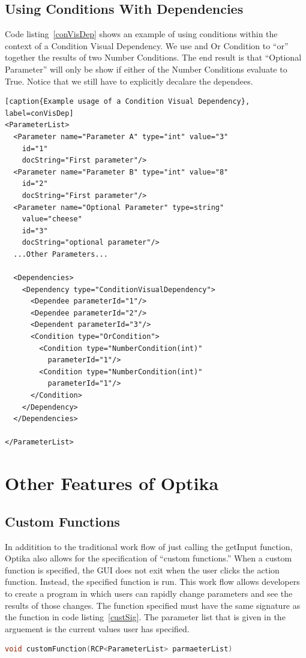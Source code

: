 \subsection{Using Conditions With Dependencies}
Code listing~\ref{conVisDep} shows an example of using conditions within the context of a Condition Visual Dependency.
We use and Or Condition to ``or'' together the results of two Number Conditions. The end result is that ``Optional Parameter'' 
will only be show if either of the Number Conditions evaluate to True. Notice that we still have to explicitly decalare
the dependees.
\begin{lstlisting}[caption{Example usage of a Condition Visual Dependency}, label=conVisDep]
<ParameterList>
  <Parameter name="Parameter A" type="int" value="3"
    id="1"
    docString="First parameter"/>
  <Parameter name="Parameter B" type="int" value="8"
    id="2"
    docString="First parameter"/>
  <Parameter name="Optional Parameter" type=string"
    value="cheese"
    id="3"
    docString="optional parameter"/>
  ...Other Parameters...

  <Dependencies>
    <Dependency type="ConditionVisualDependency">
      <Dependee parameterId="1"/>
      <Dependee parameterId="2"/>
      <Dependent parameterId="3"/>
      <Condition type="OrCondition">
        <Condition type="NumberCondition(int)" 
          parameterId="1"/>
        <Condition type="NumberCondition(int)"
          parameterId="1"/>
      </Condition>
    </Dependency>
  </Dependencies>

</ParameterList>
\end{lstlisting}

\section{Other Features of Optika}
\subsection{Custom Functions}
In additition to the traditional work flow of just calling the getInput function, Optika also allows for the specification of ``custom functions.''
When a custom function is specified, the GUI does not exit when the user clicks the action function. Instead, the specified function is run. This work flow allows developers 
to create a program in which users can rapidly change parameters and see the results of those changes. The function specified must have the same signature as the function 
in code listing~\ref{custSig}. The parameter list that is given in the arguement is the current values user has specified.
\begin{lstlisting}[language=C++, caption={The signature all custom functions must have}, label=custSig]
void customFunction(RCP<ParameterList> parmaeterList)
\end{lstlisting}

